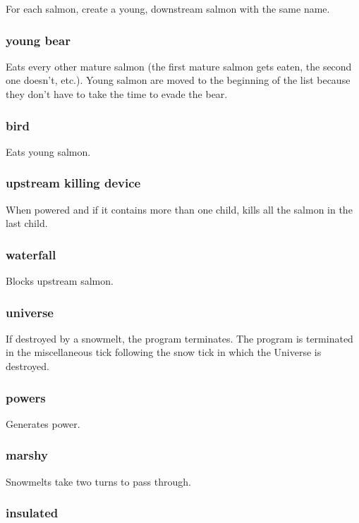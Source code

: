 \documentclass[10pt]{article}
\begin{document}
For each salmon, create a young, downstream salmon with the same name.

\subsubsection{young bear}

Eats every other mature salmon (the first mature salmon gets eaten, the second one doesn't, etc.). Young salmon are moved
to the beginning of the list because they don't have to take the
time to evade the bear.

\subsubsection{bird}

Eats young salmon.

\subsubsection{upstream killing device}

When powered and if it contains more than one child,
kills all the salmon in the last child.

\subsubsection{waterfall}

Blocks upstream salmon.

\subsubsection{universe}

If destroyed by a snowmelt, the program terminates. The program is terminated in the miscellaneous tick following the snow tick in which the Universe is
destroyed.

\subsubsection{powers}

Generates power.

\subsubsection{marshy}

Snowmelts take two turns to pass through.

\subsubsection{insulated}
\end{document}

